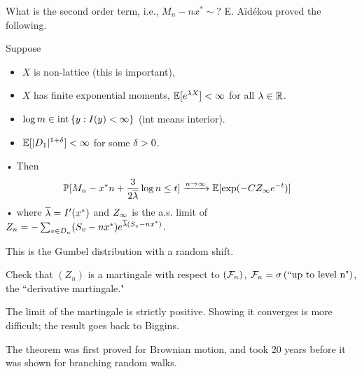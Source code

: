 What is the second order term, i.e., $M_n - nx^*\sim $? E. A\"id\'ekou proved the following.
\begin{thm}
Suppose 
\begin{itemize}
\item
$X$ is non-lattice (this is important),
\item 
$X$ has finite exponential moments,
$\E[e^{\la X}]<\iy$ for all $\la\in \R$. 
\item 
$\log m \in \text{int}\set{y}{I(y)<\iy}$ (int means interior).
\item
$\E[|D_1|^{1+\de}]<\iy$ for some $\de>0$.
\end{itemize}•
 Then
\begin{align*}
\Pj[M_n- x^*n + \fc{3}{2\ol \la }\log n\le t]
&\xra{n\to \iy} \E[\exp(-CZ_\iy e^{-t})]
\end{align*}•
where $\ol \la = I'(x^*)$ and $Z_\iy$ is the a.s. limit of $Z_n = -\sum_{v\in D_n} (S_v-nx^*) e^{\ol \la (S_v - nx^*)}$.
\end{thm}
This is the Gumbel distribution with a random shift.
\begin{exr}
Check that $(Z_n)$ is a martingale with respect to $(\cal F_n)$, $\cF_n=\si\pat{``up to level n"}$, the ``derivative martingale."
\end{exr}
The limit of the martingale is strictly positive. 
Showing it converges is more difficult; the result goes back to Biggins.

The theorem was first proved for Brownian motion, and took 20 years before it was shown for branching random walks.

